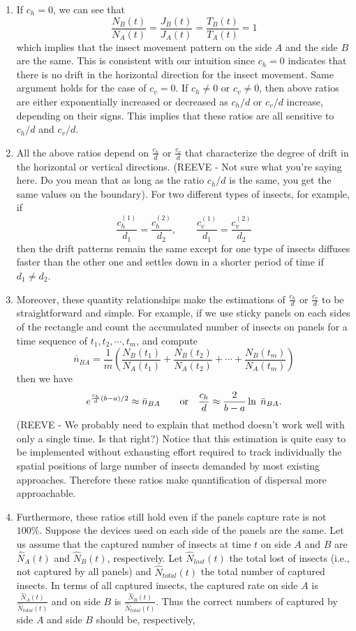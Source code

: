 \documentclass[11pt]{article}
\begin{document}
\begin{enumerate}
  \item If $c_h=0$, we can see that
\[ \frac{N_B(t)}{N_A(t)}=\frac{J_B(t)}{J_A(t)}=\frac{T_B(t)}{T_A(t)}=1\]
which implies that the insect movement pattern on the side $A$ and the side $B$ are the same. This is consistent with our intuition since $c_h=0$ indicates that there is no drift in the horizontal direction for the insect movement. Same argument holds for the case of $c_v=0$. If $c_h\not =0$ or $c_v\not =0$, then above ratios are either exponentially increased or decreased as $c_h/d$ or $c_v/d$ increase, depending on their signs.  This implies that these ratios are all sensitive to $c_h/d$ and $c_v/d$. 
  \item All the above ratios depend on $\frac{c_h}{d}$ or $\frac{c_v}{d}$ that characterize the degree of drift in the horizontal or vertical directions. (REEVE - Not sure what you're saying here.  Do you mean that as long as the ratio $c_h/d$ is the same, you get the same values on the boundary).  For two different types of insects, for example, if
 \[ \frac{c_h^{(1)}}{d_1}=\frac{c_h^{(2)}}{d_2}, \qquad \frac{c_v^{(1)}}{d_1}=\frac{c_v^{(2)}}{d_2}\]
then the drift patterns remain the same except for one type of insects  diffuses faster than the other one and settles down in a shorter period of time if $d_1\not =d_2$.
\item Moreover, these quantity relationships make the estimations of $\frac{c_h}{d}$ or $\frac{c_v}{d}$ to be straightforward and simple. For example, if we use sticky panels on each sides of the rectangle and count the accumulated number of insects on panels for a time sequence of $t_1, t_2, \cdots, t_m$, and compute
\[\bar {n}_{BA}=\frac{1}{m}\left( \frac{N_B(t_1)}{N_A(t_1)}+\frac{N_B(t_2)}{N_A(t_2)}+\cdots+\frac{N_B(t_m)}{N_A(t_m)}\right)\]
then we have
\[e^{\frac{c_h}{d}(b-a)/2}\approx \bar{n}_{BA}\qquad\hbox{or}\quad \frac{c_h}{d}\approx\frac{2}{b-a}\ln\;\bar{n}_{BA}.\]
(REEVE - We probably need to explain that method doesn't work well with only a single time.  Is that right?)  Notice that this estimation is quite easy to be implemented without exhausting effort required to track individually the spatial positions of large number of insects demanded by most existing approaches. Therefore these ratios make quantification of dispersal more approachable.  
\item Furthermore, these ratios still hold even if the panels capture rate is not $100\%$. Suppose the devices used on each side of the panels are the same. Let us assume that the captured number of insects at time $t$ on side $A$ and $B$ are $\hat{N}_A(t)$ and $\hat{N}_B(t)$, respectively. Let $\hat{N}_{lost}(t)$ the total lost of insects (i.e., not captured by all panels) and $\hat{N}_{total}(t)$ the total number of captured insects. In terms of all captured insects, the captured rate on side $A$ is $\frac{\hat{N}_A(t)}{\hat{N}_{total}(t)}$ and on side $B$ is $\frac{\hat{N}_B(t)}{\hat{N}_{total}(t)}$. Thus the correct numbers of captured by side $A$ and side $B$ should be, respectively,

\end{enumerate}
\end{document}
